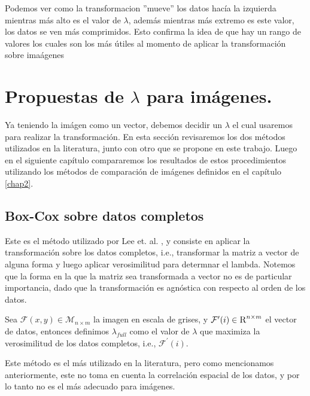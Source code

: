     Podemos ver como la transformacion ''mueve'' los datos hac\'ia la izquierda mientras m\'as alto es el valor de $\lambda$, adem\'as mientras m\'as extremo es este valor, los datos se ven m\'as comprimidos. Esto confirma la idea de que hay un rango de valores los cuales son los m\'as \'utiles al momento de aplicar la transformaci\'on sobre ima\'agenes



    \section[Propuestas de lambda]{Propuestas de $\lambda$ para im\'agenes.}\label{}


    Ya teniendo la im\'agen como un vector, debemos decidir un $\lambda$ el cual usaremos para realizar la transformaci\'on. En esta secci\'on revisaremos los dos m\'etodos utilizados en la literatura, junto con otro que se propone en este trabajo. Luego en el siguiente cap\'itulo compararemos los resultados de estos procedimientos utilizando los m\'etodos de comparaci\'on de im\'agenes definidos en el cap\'itulo \ref{chap2}.


    \subsection{Box-Cox sobre datos completos}

    Este es el m\'etodo utilizado por Lee et. al. \cite{lee2009mr}, y consiste en aplicar la transformaci\'on sobre los datos completos, i.e., transformar la matriz a vector de alguna forma y luego aplicar verosimilitud para determnar el lambda. Notemos que la forma en la que la matriz sea transformada a vector no es de particular importancia, dado que la transformaci\'on es agn\'ostica con respecto al orden de los datos. 

    \begin{defn}\label{lambda_full}
        Sea $\mathcal{F}(x, y)\in\mathcal{M}_{n\times m}$ la imagen en escala de grises, y $\mathcal{F}^{\prime}(i)\in\textsc{R}^{n\times m}$ el vector de datos, entonces definimos $\lambda_{full}$ como el valor de $\lambda$ que maximiza la verosimilitud de los datos completos, i.e., $\mathcal{F}^{\prime}(i)$.
    \end{defn}
    
    Este m\'etodo es el m\'as utilizado en la literatura, pero como mencionamos anteriormente, este no toma en cuenta la correlaci\'on espacial de los datos, y por lo tanto no es el m\'as adecuado para im\'agenes. 



